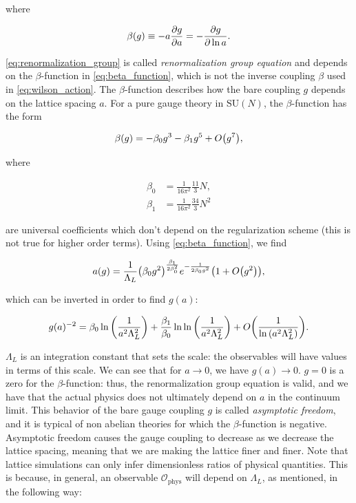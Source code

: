 \documentclass[reqno,12pt]{article}
\numberwithin{equation}{section}
\newcommand{\SU}{\mathrm{SU}}
\begin{document}
where 

\begin{equation} \label{eq:beta_function}
	\beta(g) \equiv -a \pdv{g}{a} = -\pdv{g}{\ln a}.
\end{equation}

\eqref{eq:renormalization_group} is called \textit{renormalization group equation} and depends on the $\beta$-function in
\eqref{eq:beta_function}, which is not the inverse coupling $\beta$ used in \eqref{eq:wilson_action}. The $\beta$-function
describes how the bare coupling $g$ depends on the lattice spacing $a$. For a pure gauge theory in $\SU(N)$, the $\beta$-function has
the form

\begin{equation}
	\beta(g) = -\beta_0 g^3 - \beta_1 g^5 + O\qty(g^7),
\end{equation}

where

\begin{equation}
	\begin{aligned}
		\beta_0 &= \frac{1}{16\pi^2} \frac{11}{3}N, \\
		\beta_1 &= \frac{1}{16\pi^2}\frac{34}{3}N^2
	\end{aligned}
\end{equation}

are universal coefficients which don't depend on the regularization scheme (this is not true for higher order terms). Using
\eqref{eq:beta_function}, we find

\begin{equation}
	a(g) = \frac{1}{\Lambda_L} \qty(\beta_0 g^2)^{\frac{\beta_1}{2\beta_0^2}} e^{-\frac{1}{2\beta_0 g^2}} \qty(1 + O\qty(g^2)),
\end{equation}

which can be inverted in order to find $g(a)$:

\begin{equation}
	g(a)^{-2} = \beta_0 \ln \qty(\frac{1}{a^2 \Lambda_L^2}) + \frac{\beta_1}{\beta_0} \ln \ln \qty(\frac{1}{a^2 \Lambda_L^2})
	+ O\qty(\frac{1}{\ln \qty(a^2 \Lambda_L^2)}).
\end{equation}

$\Lambda_L$ is an integration constant that sets the scale: the observables will have values in terms of this scale.
We can see that for $a \rightarrow 0$, we have $g(a) \rightarrow 0$. $g = 0$ is a zero for the $\beta$-function: thus, the
renormalization group equation is valid, and we have that the actual physics does not ultimately depend on $a$ in the continuum limit.
This behavior of the bare gauge coupling $g$ is called \textit{asymptotic freedom}, and it is typical of non abelian theories
for which the $\beta$-function is negative. Asymptotic freedom causes the gauge coupling to decrease as we decrease
the lattice spacing, meaning that we are making the lattice finer and finer. Note that lattice simulations can only
infer dimensionless ratios of physical quantities. This is because, in general, an observable $\mathcal{O}_\text{phys}$
will depend on $\Lambda_L$, as mentioned, in the following way:
\end{document}
